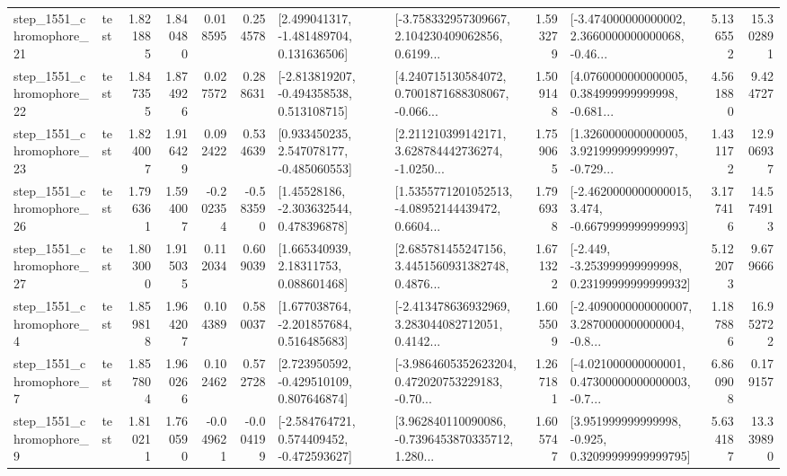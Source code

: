 \begin{tabular}{llrrrrllrlrr}
 step\_1551\_chromophore\_21 &      test &      1.821885 &    1.840480 &      0.018595 &  0.254578 &    [2.499041317, -1.481489704, 0.131636506] &  [-3.758332957309667, 2.104230409062856, 0.6199... &       1.593279 &  [-3.474000000000002, 2.3660000000000068, -0.46... &            5.136552 &         15.302891 \\
 step\_1551\_chromophore\_22 &      test &      1.847355 &    1.874926 &      0.027572 &  0.288631 &   [-2.813819207, -0.494358538, 0.513108715] &  [4.240715130584072, 0.7001871688308067, -0.066... &       1.509148 &  [4.0760000000000005, 0.384999999999998, -0.681... &            4.561880 &          9.424727 \\
 step\_1551\_chromophore\_23 &      test &      1.824007 &    1.916429 &      0.092422 &  0.534639 &    [0.933450235, 2.547078177, -0.485060553] &  [2.211210399142171, 3.628784442736274, -1.0250... &       1.759065 &  [1.3260000000000005, 3.921999999999997, -0.729... &            1.431172 &         12.906937 \\
 step\_1551\_chromophore\_26 &      test &      1.796361 &    1.594007 &     -0.202354 & -0.583590 &     [1.45528186, -2.303632544, 0.478396878] &  [1.5355771201052513, -4.08952144439472, 0.6604... &       1.796938 &  [-2.4620000000000015, 3.474, -0.6679999999999993] &            3.177416 &         14.574913 \\
 step\_1551\_chromophore\_27 &      test &      1.803000 &    1.915035 &      0.112034 &  0.609039 &      [1.665340939, 2.18311753, 0.088601468] &  [2.685781455247156, 3.4451560931382748, 0.4876... &       1.671322 &  [-2.449, -3.253999999999998, 0.23199999999999932] &            5.122073 &          9.679666 \\
  step\_1551\_chromophore\_4 &      test &      1.859818 &    1.964207 &      0.104389 &  0.580037 &    [1.677038764, -2.201857684, 0.516485683] &  [-2.413478636932969, 3.283044082712051, 0.4142... &       1.605509 &  [-2.4090000000000007, 3.2870000000000004, -0.8... &            1.187886 &         16.952722 \\
  step\_1551\_chromophore\_7 &      test &      1.857804 &    1.960266 &      0.102462 &  0.572728 &    [2.723950592, -0.429510109, 0.807646874] &  [-3.9864605352623204, 0.472020753229183, -0.70... &       1.267181 &  [-4.021000000000001, 0.47300000000000003, -0.7... &            6.860908 &          0.179157 \\
  step\_1551\_chromophore\_9 &      test &      1.810211 &    1.760590 &     -0.049621 & -0.004199 &   [-2.584764721, 0.574409452, -0.472593627] &  [3.962840110090086, -0.7396453870335712, 1.280... &       1.605747 &   [3.951999999999998, -0.925, 0.32099999999999795] &            5.634187 &         13.339890 \\

\end{tabular}
